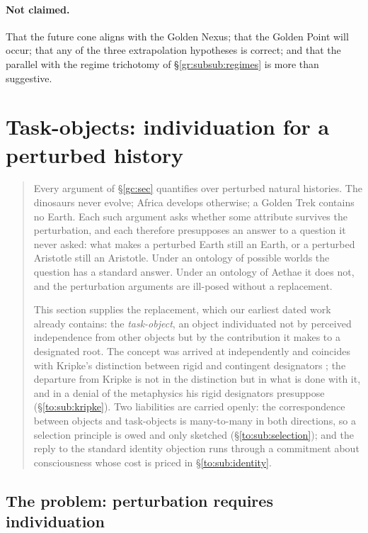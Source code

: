 \documentclass[11pt]{article}
\numberwithin{equation}{section}
\theoremstyle{plain}
\theoremstyle{definition}
\theoremstyle{remark}
\begin{document}
\paragraph{Not claimed.} That the future cone aligns with the Golden
Nexus; that the Golden Point will occur; that any of the three
extrapolation hypotheses is correct; and that the parallel with the
regime trichotomy of \S\ref{gr:subsub:regimes} is more than suggestive.

\section{Task-objects: individuation for a perturbed history}
\label{to:sec}

\begin{quote}\small
Every argument of \S\ref{gc:sec} quantifies over perturbed natural
histories. The dinosaurs never evolve; Africa develops otherwise; a
Golden Trek contains no Earth. Each such argument asks whether some
attribute survives the perturbation, and each therefore presupposes an
answer to a question it never asked: what makes a perturbed Earth still
an Earth, or a perturbed Aristotle still an Aristotle. Under an ontology
of possible worlds the question has a standard answer. Under an ontology
of Aethae it does not, and the perturbation arguments are ill-posed
without a replacement.

This section supplies the replacement, which our earliest dated
work already contains: the \emph{task-object}, an object individuated
not by perceived independence from other objects but by the contribution
it makes to a designated root. The concept was arrived at
independently and coincides with Kripke's distinction between rigid and
contingent designators \cite{kripke1980naming}; the departure from Kripke is
not in the distinction but in what is done with it, and in a denial of
the metaphysics his rigid designators presuppose
(\S\ref{to:sub:kripke}). Two liabilities are carried openly: the
correspondence between objects and task-objects is many-to-many in both
directions, so a selection principle is owed and only sketched
(\S\ref{to:sub:selection}); and the reply to the standard identity
objection runs through a commitment about consciousness whose cost is
priced in \S\ref{to:sub:identity}.
\end{quote}

\subsection{The problem: perturbation requires individuation}
\label{to:sub:problem}
\end{document}
